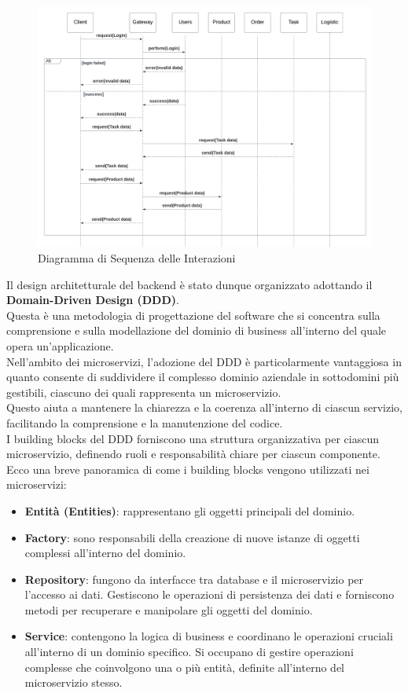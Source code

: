 \begin{figure}[H]
    \centering
    \includegraphics[width=\textwidth]{document/sections/img/sequenceDiagram.png}
    \caption{Diagramma di Sequenza delle Interazioni}
    \label{fig:sequenceDiagram}
\end{figure}
Il design architetturale del backend è stato dunque organizzato adottando il \textbf{Domain-Driven Design (DDD)}.
\\Questa è una metodologia di progettazione del software che si concentra sulla comprensione e sulla modellazione
del dominio di business all'interno del quale opera un'applicazione.\\ Nell'ambito dei microservizi,
l'adozione del DDD è particolarmente vantaggiosa in quanto consente di suddividere il complesso dominio
aziendale in sottodomini più gestibili, ciascuno dei quali rappresenta un microservizio.\\ Questo aiuta a
mantenere la chiarezza e la coerenza all'interno di ciascun servizio, facilitando la comprensione e la
manutenzione del codice.\\
I building blocks del DDD forniscono una struttura organizzativa per ciascun microservizio,
definendo ruoli e responsabilità chiare per ciascun componente.\\ Ecco una breve panoramica di come i building
blocks vengono utilizzati nei microservizi:

\begin{itemize}
    \item \textbf{Entità (Entities)}: rappresentano gli oggetti principali del dominio.
    \item \textbf{Factory}: sono responsabili della creazione di nuove istanze di oggetti complessi all'interno del dominio.
    \item \textbf{Repository}: fungono da interfacce tra database e il microservizio per l'accesso ai dati. Gestiscono le operazioni di persistenza dei dati e forniscono metodi per recuperare e manipolare gli oggetti del dominio.
    \item \textbf{Service}: contengono la logica di business e coordinano le operazioni cruciali all'interno di un dominio specifico. Si occupano di gestire operazioni complesse che coinvolgono una o più entità, definite all'interno del microservizio stesso.
\end{itemize}

